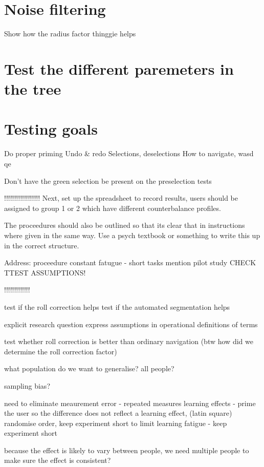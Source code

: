 \section{Noise filtering}

Show how the radius factor thinggie helps

\section{Test the different paremeters in the tree}


\section{Testing goals}

Do proper priming
Undo & redo
Selections, deselections
How to navigate, wasd qe

Don't have the green selection be present on the preselection tests


!!!!!!!!!!!!!!!!!!
Next, set up the spreadsheet to record results, users should be assigned to group 1 or 2 which have different counterbalance profiles.

The proceedures should also be outlined so that its clear that in instructions where given in the same way. Use a psych textbook or something to write this up in the correct structure.

Address:
proceedure constant
fatugue - short tasks
mention pilot study
CHECK TTEST ASSUMPTIONS!

!!!!!!!!!!!!!


test if the roll correction helps
test if the automated segmentation helps


explicit research question
express assumptions in operational definitions of terms

test whether roll correction is better than ordinary navigation
(btw how did we determine the roll correction factor)

what population do we want to generalise?
all people?

sampling bias?

need to eliminate meaurement error - repeated measures
learning effects - prime the user so the difference does not reflect a learning effect, (latin square) randomise order, keep experiment short to limit learning
fatigue - keep experiment short

because the effect is likely to vary between people, we need multiple people to make sure the effect is consistent?


